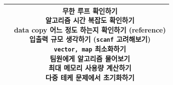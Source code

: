 \documentclass[landscape, 8pt, a4paper, oneside, twocolumn]{extarticle}
\begin{document}
\begin{table}[H]
\begin{tabular}{|c|c|}
{        } &
        \makecell{
            \textbf{무한 루프 확인하기} \\
            \textbf{알고리즘 시간 복잡도 확인하기} \\
            data copy 어느 정도 하는지 확인하기 (reference) \\
            입출력 규모 생각하기 (\texttt{scanf} 고려해보기) \\
            \texttt{vector, map} 최소화하기 \\
            팀원에게 알고리즘 물어보기 \\
            최대 메모리 사용량 계산하기 \\
            다중 테케 문제에서 초기화하기 \\ 
        } \\ \hline
        
    \end{tabular}
\end{table}
\end{document}
